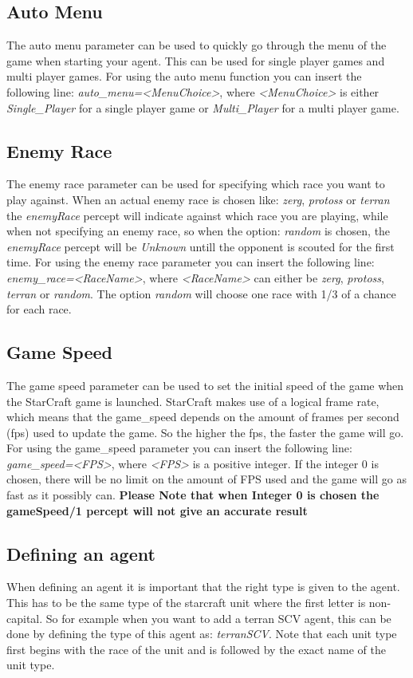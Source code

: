 \subsection{Auto Menu}
\label{auto menu}
The auto menu parameter can be used to quickly go through the menu of the game when starting your agent. This can be used for single player games and multi player games. For using the auto menu function you can insert the following line: \textit{auto\_menu=<MenuChoice>}, where \textit{<MenuChoice>} is either \textit{Single\_Player} for a single player game or \textit{Multi\_Player} for a multi player game.

\subsection{Enemy Race}
\label{enemy race}
The enemy race parameter can be used for specifying which race you want to play against. When an actual enemy race is chosen like: \textit{zerg}, \textit{protoss} or \textit{terran} the \textit{enemyRace} percept will indicate against which race you are playing, while when not specifying an enemy race, so when the option: \textit{random} is chosen, the \textit{enemyRace} percept will be \textit{Unknown} untill the opponent is scouted for the first time. For using the enemy race parameter you can insert the following line: \textit{enemy\_race=<RaceName>}, where \textit{<RaceName>} can either be \textit{zerg}, \textit{protoss}, \textit{terran} or \textit{random}. The option \textit{random} will choose one race with 1/3 of a chance for each race. 

\subsection{Game Speed}
\label{game speed}
The game speed parameter can be used to set the initial speed of the game when the StarCraft game is launched. StarCraft makes use of a logical frame rate, which means that the game\_speed depends on the amount of frames per second (fps) used to update the game. So the higher the fps, the faster the game will go. For using the game\_speed parameter you can insert the following line: \textit{game\_speed=<FPS>}, where \textit{<FPS>} is a positive integer. If the integer 0 is chosen, there will be no limit on the amount of FPS used and the game will go as fast as it possibly can. \textbf{Please Note that when Integer 0 is chosen the gameSpeed/1 percept will not give an accurate result}

\subsection{Defining an agent}
When defining an agent it is important that the right type is given to the agent. This has to be the same type of the starcraft unit where the first letter is non-capital. So for example when you want to add a terran SCV agent, this can be done by defining the type of this agent as: \textit{terranSCV}. Note that each unit type first begins with the race of the unit and is followed by the exact name of the unit type.

